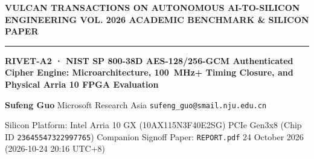 \documentclass[11pt,a4paper]{article}
\begin{document}
{\scriptsize\sffamily\textcolor{vulcan}{\textbf{VULCAN TRANSACTIONS ON AUTONOMOUS AI-TO-SILICON ENGINEERING \hfill VOL. 2026 \textperiodcentered{} ACADEMIC BENCHMARK \& SILICON PAPER}}\par}

\vspace{1pt}\textcolor{vulcan}{\rule{\textwidth}{1.2pt}}\vspace{3pt}

\begin{center}

{\sffamily\LARGE\bfseries RIVET-A2 · NIST SP 800-38D AES-128/\allowbreak{}256-GCM Authenticated Cipher Engine: Microarchitecture, 100~MHz+ Timing Closure, and Physical Arria 10 FPGA Evaluation\par}\vspace{3pt}

{\small\sffamily\textbf{Sufeng Guo} \textperiodcentered{} Microsoft Research Asia \textperiodcentered{} \texttt{sufeng\_guo@smail.nju.edu.cn}\par}\vspace{1pt}

{\scriptsize\sffamily\textcolor{black!75}{Silicon Platform: Intel Arria 10 GX (\allowbreak{}10AX115N3F40E2SG)\allowbreak{} PCIe Gen3x8 (Chip ID \texttt{23645547322997765}) \textperiodcentered{} Companion Signoff Paper: \texttt{REPORT.pdf} \textperiodcentered{} 24 October 2026 (\allowbreak{}2026-10-24 20:16 UTC+\allowbreak{}8)\allowbreak{}}\par}

\end{center}\vspace{2pt}
\end{document}
